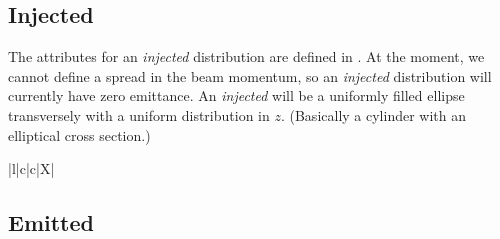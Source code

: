 \subsection{Injected }
The attributes for an \emph{injected}  distribution are defined in .
At the moment, we cannot define a spread in the beam momentum, so an \emph{injected} 
distribution will currently have zero emittance. An \emph{injected}  will be a uniformly filled ellipse transversely
with a uniform distribution in $z$. (Basically a cylinder with an elliptical cross section.)

\begin{table}[!htb]
  \begin{center}\footnotesize
    \caption{Definition of the basic distribution attributes for an \emph{injected}  distribution type.}
    \label{tab:distattrflattopinj}
    \begin{tabularx}{\textwidth-1cm}{|l|c|c|X|}
      \hline
      \hline
      \hline
    \end{tabularx}
  \end{center}
\end{table}


\subsection{Emitted }

